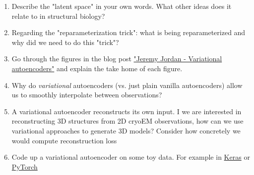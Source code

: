 \documentclass[11pt, oneside]{article}   	%
\begin{document}
\begin{enumerate}
	\item Describe the "latent space" in your own words. What other ideas does it relate to in structural biology?
	\item Regarding the "reparameterization trick": what is being reparameterized and why did we need to do this "trick"?
	\item Go through the figures in the blog post \href{https://www.jeremyjordan.me/variational-autoencoders/}{"Jeremy Jordan - Variational autoencoders"} and explain the take home of each figure.
	\item Why do {\it variational} autoencoders (vs. just plain vanilla autoencoders) allow us to smoothly interpolate between observations?
	\item A variational autoencoder reconstructs its own input. I we are interested in reconstructing 3D structures from 2D  cryoEM observations, how can we use variational approaches to generate 3D models? Consider how concretely we would compute reconstruction loss
	\item Code up a variational autoencoder on some toy data. For example in \href{https://tiao.io/post/tutorial-on-variational-autoencoders-with-a-concise-keras-implementation/}{Keras} or \href{https://towardsdatascience.com/variational-autoencoder-demystified-with-pytorch-implementation-3a06bee395ed}{PyTorch}
\end{enumerate}
\end{document}
